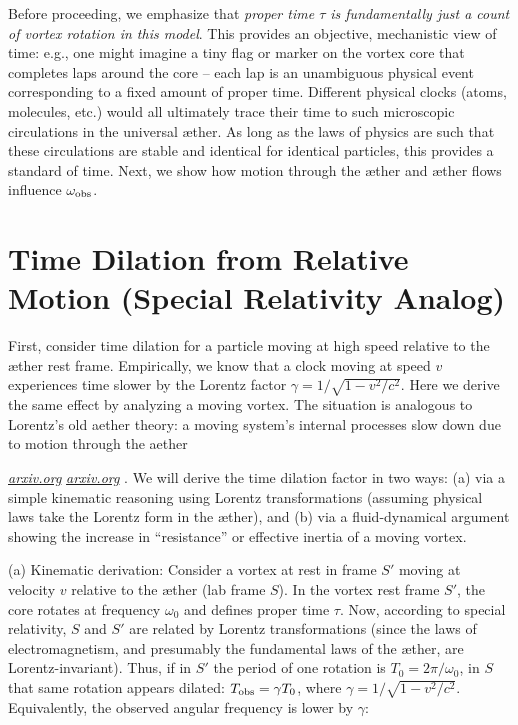\documentclass[aps,preprint,superscriptaddress]{revtex4}
\begin{document}
Before proceeding, we emphasize that \textit{proper time $\tau$ is fundamentally just a count of vortex rotation in this model}. This provides an objective, mechanistic view of time: e.g., one might imagine a tiny flag or marker on the vortex core that completes laps around the core – each lap is an unambiguous physical event corresponding to a fixed amount of proper time. Different physical clocks (atoms, molecules, etc.) would all ultimately trace their time to such microscopic circulations in the universal æther. As long as the laws of physics are such that these circulations are stable and identical for identical particles, this provides a standard of time. Next, we show how motion through the æther and æther flows influence $\omega_{\rm obs}$.

\section*{Time Dilation from Relative Motion (Special Relativity Analog)}

First, consider time dilation for a particle moving at high speed relative to the æther rest frame. Empirically, we know that a clock moving at speed $v$ experiences time slower by the Lorentz factor $\gamma = 1/\sqrt{1-v^2/c^2}$. Here we derive the same effect by analyzing a moving vortex. The situation is analogous to Lorentz’s old aether theory: a moving system’s internal processes slow down due to motion through the aether

\href{https://arxiv.org/pdf/physics/0611077#:~:text=relativity%20theory%2C%20but%20obviously%20its,light%20in%20all%20inertial%20frames}{\textit{arxiv.org}}
\href{https://arxiv.org/pdf/physics/0611077#:~:text=We%20should%20note%20that%2C%20when,a%20state%20of%20absolute%20rest}{\textit{arxiv.org}}
. We will derive the time dilation factor in two ways: (a) via a simple kinematic reasoning using Lorentz transformations (assuming physical laws take the Lorentz form in the æther), and (b) via a fluid-dynamical argument showing the increase in “resistance” or effective inertia of a moving vortex.

(a) Kinematic derivation: Consider a vortex at rest in frame $S'$ moving at velocity $v$ relative to the æther (lab frame $S$). In the vortex rest frame $S'$, the core rotates at frequency $\omega_0$ and defines proper time $\tau$. Now, according to special relativity, $S$ and $S'$ are related by Lorentz transformations (since the laws of electromagnetism, and presumably the fundamental laws of the æther, are Lorentz-invariant). Thus, if in $S'$ the period of one rotation is $T_0 = 2\pi/\omega_0$, in $S$ that same rotation appears dilated: $T_{\rm obs} = \gamma T_0$, where $\gamma = 1/\sqrt{1-v^2/c^2}$. Equivalently, the observed angular frequency is lower by $\gamma$:
\end{document}
